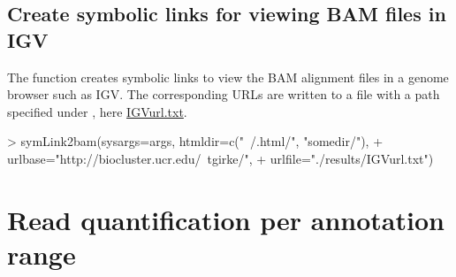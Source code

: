 \documentclass{article}
\begin{document}
\subsection{Create symbolic links for viewing BAM files in IGV}
The  function creates symbolic links to view the BAM alignment files in a genome browser such as IGV. The corresponding URLs are written to a file with a path specified under , here \href{run:./results/IGVurl.txt}{IGVurl.txt}.
\begin{Schunk}
\begin{Sinput}
> symLink2bam(sysargs=args, htmldir=c("~/.html/", "somedir/"), 
+             urlbase="http://biocluster.ucr.edu/~tgirke/", 
+ 	    urlfile="./results/IGVurl.txt")
\end{Sinput}
\end{Schunk}

\section{Read quantification per annotation range}
\end{document}
